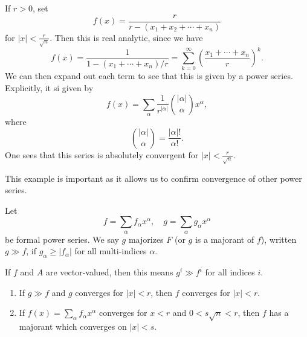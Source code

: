 \documentclass[a4paper]{article}
\begin{document}
\begin{eg}
  If $r > 0$, set
  \[
    f(x) = \frac{r}{r - (x_1 + x_2 + \cdots + x_n)}
  \]
  for $|x| < \frac{r}{\sqrt{n}}$. Then this is real analytic, since we have
  \[
    f(x) = \frac{1}{1 - (x_1 + \cdots + x_n)/r} = \sum_{k = 0}^\infty \left(\frac{x_1 + \cdots + x_n}{r}\right)^k.
  \]
  We can then expand out each term to see that this is given by a power series. Explicitly, it si given by
  \[
    f(x) = \sum_\alpha \frac{1}{r^{|\alpha|}}\binom{|\alpha|}{\alpha} x^\alpha,
  \]
  where
  \[
    \binom{|\alpha|}{\alpha} = \frac{|\alpha|!}{\alpha!}.
  \]
  One sees that this series is absolutely convergent for $|x| < \frac{r}{\sqrt{n}}$.
\end{eg}
This example is important as it allows us to confirm convergence of other power series.

\begin{defi}[Majorant]
  Let
  \[
    f = \sum_\alpha f_\alpha x^\alpha,\quad g = \sum_\alpha g_\alpha x^\alpha
  \]
  be formal power series. We say $g$ majorizes $F$ (or $g$ is a majorant of $f$), written $g \gg f$, if $g_\alpha \geq |f_\alpha|$ for all multi-indices $\alpha$.

  If $f$ and $A$ are vector-valued, then this means $g^i \gg f^i$ for all indices $i$.
\end{defi}

\begin{lemma}\leavevmode
  \begin{enumerate}
    \item If $g \gg f$ and $g$ converges for $|x| < r$, then $f$ converges for $|x| < r$.
    \item If $f(x) = \sum_\alpha f_\alpha x^\alpha$ converges for $x < r$ and $0 < s\sqrt{n} < r$, then $f$ has a majorant which converges on $|x| < s$. %
  \end{enumerate}
\end{lemma}
\end{document}
